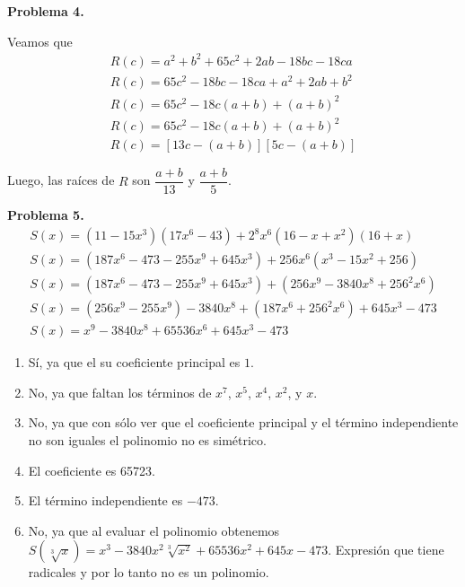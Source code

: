 \textbf{Problema 4.}

Veamos que
\begin{gather*}
    R(c) = a^2 + b^2 + 65c^2 + 2ab - 18bc - 18ca\\
    R(c) = 65c^2 - 18bc - 18ca + a^2 + 2ab + b^2\\
    R(c) = 65c^2 - 18c(a + b) + (a + b)^2\\
    R(c) = 65c^2 - 18c(a + b) + (a + b)^2\\
    R(c) = [13c - (a + b)][5c - (a + b)]
\end{gather*}

Luego, las raíces de $R$ son $\boxed{\dfrac{a + b}{13}}$ y $\boxed{\dfrac{a + b}{5}}$.

\textbf{Problema 5.}
\begin{gather*}
    S(x) = (11 - 15x^3)(17x^6 - 43) + 2^8 x^6 (16 - x + x^2)(16 + x)\\
    S(x) = (187 x^6 - 473 - 255x^9 + 645x^3) + 256 x^6 (x^3 - 15x^2 + 256)\\
    S(x) = (187 x^6 - 473 - 255x^9 + 645x^3) + (256 x^9 - 3840 x^8 + 256^2 x^6)\\
    S(x) = (256 x^9 - 255x^9) - 3840 x^8 + (187 x^6 + 256^2 x^6) + 645x^3 - 473\\
    S(x) = x^9 - 3840 x^8 + 65536 x^6 + 645x^3 - 473
\end{gather*}

\begin{enumerate}
    \item Sí, ya que el su coeficiente principal es $1$.
    \item No, ya que faltan los términos de $x^7$, $x^5$, $x^4$, $x^2$, y $x$.
    \item No, ya que con sólo ver que el coeficiente principal y el término independiente no son iguales el polinomio no es simétrico.
    \item El coeficiente es 65723.
    \item El término independiente es $-473$.
    \item No, ya que al evaluar el polinomio obtenemos $S(\sqrt[3]{x}) = x^3 - 3840 x^2\sqrt[3]{x^2} + 65536 x^2 + 645x - 473$. Expresión que tiene radicales y por lo tanto no es un polinomio.
\end{enumerate}